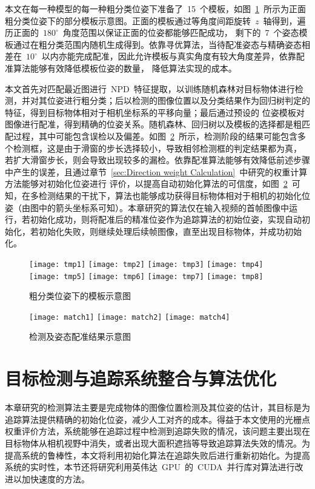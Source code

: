 本文在每一种模型的每一种粗分类位姿下准备了~15~个模板，如图~\ref{fig:chap04:tem_show}~所示为正面粗分类位姿下的部分模板示意图。正面的模板通过等角度间距旋转~$z$~轴得到，遍历正面的~$180^\circ$~角度范围以保证正面的位姿都能够匹配成功，
剩下的~7~个姿态模板通过在粗分类范围内随机生成得到。依靠寻优算法，当待配准姿态与精确姿态相差在~$10^\circ $~以内亦能完成配准，因此允许模板与真实角度有较大角度差异，依靠配准算法能够有效降低模板位姿的数量，
降低算法实现的成本。

本文首先对匹配最近图进行~NPD~特征提取，以训练随机森林对目标物体进行检测，并对其位姿进行粗分类；后以检测的图像位置以及分类结果作为回归树判定的特征，得到目标物体相对于相机坐标系的平移向量；最后通过预设的
位姿模板对图像进行配准，得到精确的位姿关系。随机森林、回归树以及模板的选择都是粗匹配过程，其中可能包含误检以及偏差。如图~\ref{fig:chap04:match_res}~所示，检测阶段的结果可能包含多个检测框，这是由于滑窗的步长选择较小，导致相邻检测框的判定结果都为真，
若扩大滑窗步长，则会导致出现较多的漏检。依靠配准算法能够有效降低前述步骤中产生的误差，且通过章节~\ref{sec:Direction weight Calculation}~中研究的权重计算方法能够对初始化位姿进行
评价，以提高自动初始化算法的可信度，如图~\ref{fig:chap04:match_res}~可知，在多检测结果的干扰下，算法也能够成功获得目标物体相对于相机的初始化位姿（由图中的箭头坐标系可知）。本章研究的算法仅在输入视频的首帧图像中运行，若初始化成功，则将配准后的精准位姿作为追踪算法的初始位姿，实现自动初始化，若初始化失败，则继续处理后续帧图像，直至出现目标物体，并成功初始化。

\begin{figure}[t] %
  \centering%
    \texttt{[image: tmp1]}
    \texttt{[image: tmp2]}
    \texttt{[image: tmp3]}
    \texttt{[image: tmp4]}
    \quad
    \texttt{[image: tmp5]}
    \texttt{[image: tmp6]}
    \texttt{[image: tmp7]}
    \texttt{[image: tmp8]}
  \caption{粗分类位姿下的模板示意图}
    \label{fig:chap04:tem_show}
\end{figure}

\begin{figure}[t] %
  \centering%
    \texttt{[image: match1]}
    \texttt{[image: match2]}
    \texttt{[image: match4]}
  \caption{检测及姿态配准结果示意图}
    \label{fig:chap04:match_res}
\end{figure}

\section{目标检测与追踪系统整合与算法优化}
\label{sec:detect_with_tracking_youhua}
本章研究的检测算法主要是完成物体的图像位置检测及其位姿的估计，其目标是为追踪算法提供精确的初始化位姿，减少人工对齐的成本。得益于本文使用的光栅点权重评价方法，系统能够在追踪过程中检测到追踪失败的情况，该问题主要出现在
目标物体从相机视野中消失，或者出现大面积遮挡等导致追踪算法失效的情况。为提高系统的鲁棒性，本文将利用初始化算法在追踪失败后进行重新初始化。为提高系统的实时性，本节还将研究利用英伟达~GPU~的~CUDA~并行库对算法进行改进以加快速度的方法。

